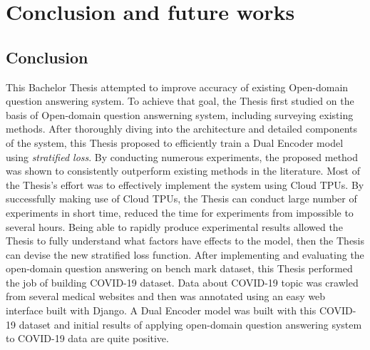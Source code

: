 \documentclass[12pt, sort&compress]{report}
\begin{document}
\chapter{Conclusion and future works}
\label{chap:06}
\section{Conclusion}
\label{sec:6.1}
This Bachelor Thesis attempted to improve accuracy of existing Open-domain question answering system. To achieve that goal, the Thesis first studied on the basis of Open-domain question answerning system, including surveying existing methods. After thoroughly diving into the architecture and detailed components of the system, this Thesis proposed to efficiently train a Dual Encoder model using \textit{stratified loss}. By conducting numerous experiments, the proposed method was shown to consistently outperform existing methods in the literature. Most of the Thesis's effort was to effectively implement the system using Cloud TPUs. By successfully making use of Cloud TPUs, the Thesis can conduct large number of experiments in short time, reduced the time for experiments from impossible to several hours. Being able to rapidly produce experimental results allowed the Thesis to fully understand what factors have effects to the model, then the Thesis can devise the new stratified loss function. After implementing and evaluating the open-domain question answering on bench mark dataset, this Thesis performed the job of building COVID-19 dataset. Data about COVID-19 topic was crawled from several medical websites and then was annotated using an easy web interface built with Django. A Dual Encoder model was built with this COVID-19 dataset and initial results of applying open-domain question answering system to COVID-19 data are quite positive.
\end{document}
